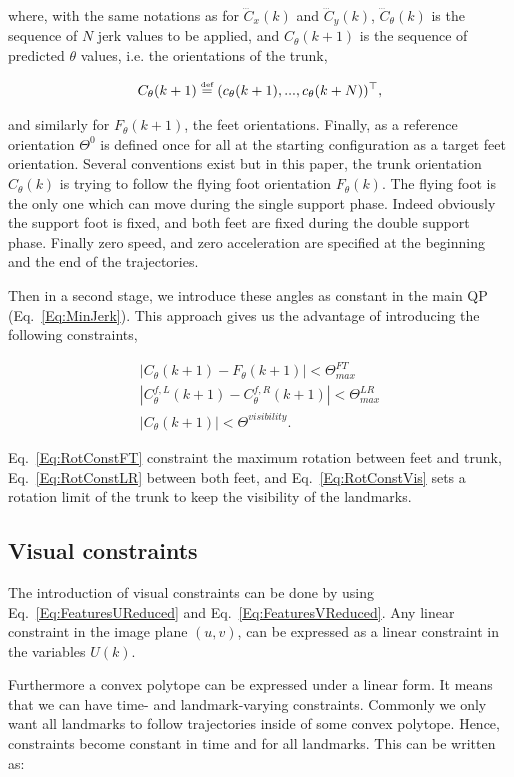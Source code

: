 where, with the same notations as for $\dddot{C}_x(k)$ and $\dddot{C}_y(k)$, $\dddot{C}_{\theta}(k)$ is the sequence of $N$ jerk values to be applied, and $C_{\theta}(k+1)$ is the sequence of predicted $\theta$ values, i.e. the orientations of the trunk,  

$$
C_{\theta}(k+1) \stackrel{\mbox{\tiny def}}{=} (c_{\theta}(k+1),...,c_{\theta}(k+N))^{\top},
$$

and similarly for $F_{\theta}(k+1)$, the feet orientations. Finally, as a reference orientation $\Theta^{0}$ is defined once for all at the starting configuration as a target feet orientation. Several conventions exist but in this paper, the trunk orientation $C_{\theta}(k)$ is trying to follow the flying foot orientation $F_{\theta}(k)$. The flying foot is the only one which can move during the single support phase. Indeed obviously the support foot is fixed, and both feet are fixed during the double support phase. Finally zero speed, and zero acceleration are specified at the beginning and the end of the trajectories.

Then in a second stage, we introduce these angles as constant in the main QP (Eq.~\ref{Eq:MinJerk}). This approach gives us the advantage of introducing the following constraints,

\begin{eqnarray}
\label{Eq:RotConstFT}
| C_{\theta}(k+1) - F_{\theta}(k+1)| < \Theta^{FT}_{max} \\
\label{Eq:RotConstLR}
| C_{\theta}^{f,L}(k+1) - C_{\theta}^{f,R}(k+1)| < \Theta^{LR}_{max} \\
\label{Eq:RotConstVis}
| C_{\theta}(k+1)| < \Theta^{visibility}.
\end{eqnarray}

Eq.~\ref{Eq:RotConstFT} constraint the maximum rotation between feet and trunk, Eq.~\ref{Eq:RotConstLR} between both feet, and Eq.~\ref{Eq:RotConstVis} sets a rotation limit of the trunk to keep the visibility of the landmarks.

\subsection{Visual constraints}


The introduction of visual constraints can be done by using Eq.~\ref{Eq:FeaturesUReduced} and Eq.~\ref{Eq:FeaturesVReduced}. Any linear constraint in the image plane $(u,v)$, can be expressed as a linear constraint in the variables $U(k)$.

Furthermore a convex polytope can be expressed under a linear form. It means that we can have time- and landmark-varying constraints. Commonly we only want all landmarks to follow trajectories inside of some convex polytope. Hence, constraints become constant in time and for all landmarks. This can be written as:

